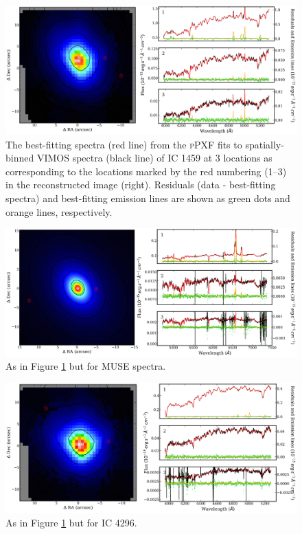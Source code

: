 			\begin{figure}
				\centering
				\includegraphics[width=.9\textwidth]{chapter4/pPXF_fits_vimos_ic1459.png}
				\caption[Best-fitting spectra by \textsc{pPXF} for the VIMOS datacube for IC 1459]{The best-fitting spectra (red line) from the \textsc{pPXF} fits to spatially-binned VIMOS spectra (black line) of IC 1459 at 3 locations as corresponding to the locations marked by the red numbering (1--3) in the reconstructed image (right). Residuals (data - best-fitting spectra) and best-fitting emission lines are shown as green dots and orange lines, respectively.}
				\label{fig:ppxf1}
			\end{figure}
			\begin{figure}
				\centering
				\includegraphics[width=.9\textwidth]{chapter4/pPXF_fits_muse_ic1459.png}
				\caption[Best-fitting spectra by \textsc{pPXF} for the MUSE datacube for IC 1459]{As in Figure \ref{fig:ppxf1} but for MUSE spectra.}
				\label{fig:ppxf2}
			\end{figure}
			\begin{figure}
				\centering
				\includegraphics[width=.9\textwidth]{chapter4/pPXF_fits_vimos_ic4296.png}
				\caption[Best-fitting spectra by \textsc{pPXF} for the VIMOS datacube for IC 4296]{As in Figure \ref{fig:ppxf1} but for IC 4296.}
				\label{fig:ppxf3}
			\end{figure}
